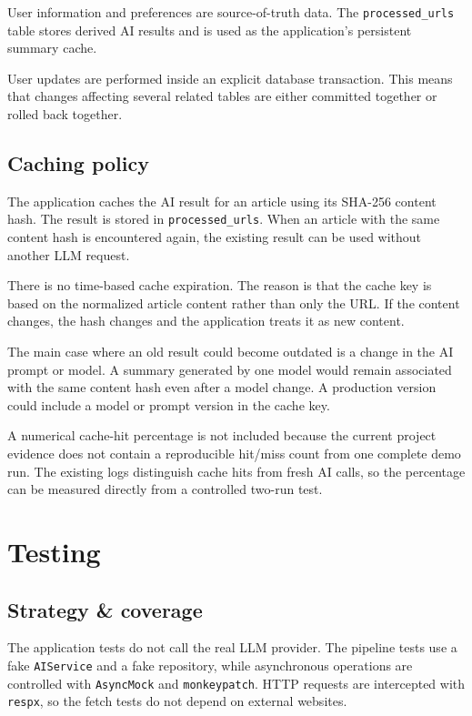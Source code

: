 \documentclass[11pt,a4paper]{article}
\begin{document}
User information and preferences are source-of-truth data. The \texttt{processed\_urls} table stores derived AI results and is used as the application's persistent summary cache.

User updates are performed inside an explicit database transaction. This means that changes affecting several related tables are either committed together or rolled back together.

\subsection{Caching policy}

The application caches the AI result for an article using its SHA-256 content hash. The result is stored in \texttt{processed\_urls}. When an article with the same content hash is encountered again, the existing result can be used without another LLM request.

There is no time-based cache expiration. The reason is that the cache key is based on the normalized article content rather than only the URL. If the content changes, the hash changes and the application treats it as new content.

The main case where an old result could become outdated is a change in the AI prompt or model. A summary generated by one model would remain associated with the same content hash even after a model change. A production version could include a model or prompt version in the cache key.

A numerical cache-hit percentage is not included because the current project evidence does not contain a reproducible hit/miss count from one complete demo run. The existing logs distinguish cache hits from fresh AI calls, so the percentage can be measured directly from a controlled two-run test.

\section{Testing}\label{sec:testing}

\subsection{Strategy \& coverage}

The application tests do not call the real LLM provider. The pipeline tests use a fake \texttt{AIService} and a fake repository, while asynchronous operations are controlled with \texttt{AsyncMock} and \texttt{monkeypatch}. HTTP requests are intercepted with \texttt{respx}, so the fetch tests do not depend on external websites.
\end{document}
